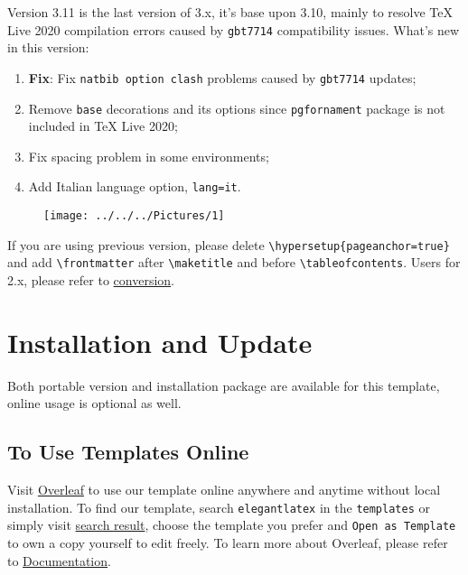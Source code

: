 \documentclass[11pt,fancy,authoryear]{elegantbook}
\begin{document}
Version 3.11 is the last version of 3.x, it's base upon 3.10, mainly to resolve \TeX{} Live 2020 compilation errors caused by \lstinline{gbt7714} compatibility issues. What\rq s new in this version:

\begin{enumerate}
  \item \textbf{Fix}: Fix \lstinline{natbib option clash} problems caused by \lstinline{gbt7714} updates;
  \item Remove \lstinline{base} decorations and its options since \lstinline{pgfornament} package is not included in \TeX{} Live 2020;
  \item Fix spacing problem in some environments;
  \item Add Italian language option, \lstinline{lang=it}.
\end{enumerate}


\begin{figure}[h]
	\centering
	\texttt{[image: ../../../Pictures/1]}
	\caption{}
	\label{fig:1}
\end{figure}

\begin{note}
  If you are using previous version, please delete \lstinline|\hypersetup{pageanchor=true}| and add \lstinline{\frontmatter} after \lstinline{\maketitle} and before \lstinline{\tableofcontents}. Users for 2.x, please refer to \href{https://github.com/ElegantLaTeX/ElegantBook/wiki/convert}{conversion}.
\end{note}

\section{Installation and Update}
Both portable version and installation package are available for this template, online usage is optional as well.

\subsection{To Use Templates Online}
Visit \href{https://www.overleaf.com/}{Overleaf} to use our template online anywhere and anytime without local installation. To find our template, search \lstinline{elegantlatex} in the \lstinline{templates} or simply visit \href{https://www.overleaf.com/latex/templates?addsearch=elegantlatex}{search result}, choose the template you prefer and \lstinline{Open as Template} to own a copy yourself to edit freely. To learn more about Overleaf, please refer to \href{https://www.overleaf.com/learn}{Documentation}.
\end{document}

